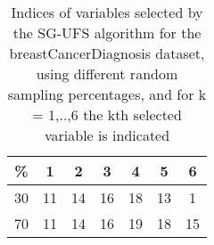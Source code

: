 \begin{table}
	\begin{center}
		\begin{tabular}{c c c c c c c}
			\% & 1 & 2 & 3 & 4 & 5 & 6 \\
			\hline
			30 & 11 & 14 & 16 & 18 & 13 & 1 \\
			70 & 11 & 14 & 16 & 19 & 18 & 15 \\
		\end{tabular}
	\end{center}
	\caption{Indices of variables selected by the SG-UFS algorithm for the breastCancerDiagnosis dataset, using different random sampling percentages, and for k = 1,..,6 the kth selected variable is indicated}
\end{table}